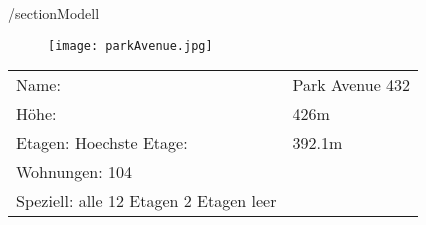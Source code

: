 /section{Modell}
\begin{figure}[H]
\centering
\texttt{[image: parkAvenue.jpg]}
\end{figure}
\begin{table}[H]
\begin{tabular}{ll}
Name:				& Park Avenue 432\\
Höhe: 				& 426m\\          
Etagen:				%
Hoechste Etage:		&392.1m\\
Wohnungen:			104\\
Speziell:			alle 12 Etagen 2 Etagen leer\\           
\end{tabular}
\end{table}